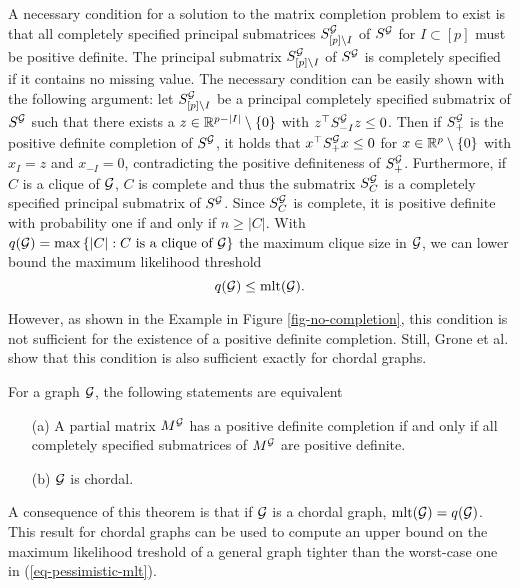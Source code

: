 A necessary condition for a solution to the matrix completion problem to exist is that all completely specified principal submatrices $S^{\mathcal{G}}_{[p]\setminus I}$ of $S^{\mathcal{G}}$ for $I \subset [p]$ must be positive definite. The principal submatrix $S^{\mathcal{G}}_{[p]\setminus I}$ of $S^{\mathcal{G}}$ is completely specified if it contains no missing value. The necessary condition can be easily shown with the following argument: let $S^{\mathcal{G}}_{[p]\setminus I}$ be a principal completely specified submatrix of $S^{\mathcal{G}}$ such that there exists a $z \in \mathbb{R}^{p-|I|}\setminus {\left\{0\right\}}$ with $z^\top S^{\mathcal{G}}_{-I} z \leq 0$. Then if $S^{\mathcal{G}}_+$ is the positive definite completion of $S^{\mathcal{G}}$, it holds that $x^\top S^{\mathcal{G}}_+ x \leq 0$ for $x \in \mathbb{R}^p \setminus {\left\{0\right\}}$ with $x_I = z$ and $x_{-I} = 0$, contradicting the positive definiteness of $S^{\mathcal{G}}_+$. Furthermore, if $C$ is a clique of ${\mathcal{G}}$, $C$ is complete and thus the submatrix $S^{\mathcal{G}}_C$ is a completely specified principal submatrix of $S^{\mathcal{G}}$. Since $S^{\mathcal{G}}_C$ is complete, it is positive definite with probability one if and only if $n \geq |C|$. With $q({\mathcal{G}}) = \max {\left\{|C| : C {\textrm{ is a clique of }} {\mathcal{G}}\right\}}$ the maximum clique size in ${\mathcal{G}}$, we can lower bound the maximum likelihood threshold
\begin{equation*}
    q({\mathcal{G}}) \leq {\textrm{mlt}}({\mathcal{G}}).
\end{equation*}



However, as shown in the Example in Figure \ref{fig-no-completion}, this condition is not sufficient for the existence of a positive definite completion. Still, Grone et al. \cite{GRONE1984109} show that this condition is also sufficient exactly for chordal graphs.
\begin{theorem} \label{thm-chordal-iff}
    For a graph ${\mathcal{G}}$, the following statements are equivalent
    \begin{itemize}
        \item[(a)] A partial matrix $M^{\mathcal{G}}$ has a positive definite completion if and only if all completely specified submatrices of $M^{\mathcal{G}}$ are positive definite.
        \item[(b)] ${\mathcal{G}}$ is chordal.
    \end{itemize}
\end{theorem}
A consequence of this theorem is that if ${\mathcal{G}}$ is a chordal graph, ${\textrm{mlt}}({\mathcal{G}}) = q({\mathcal{G}})$. This result for chordal graphs can be used to compute an upper bound on the maximum likelihood treshold of a general graph tighter than the worst-case one in (\ref{eq-pessimistic-mlt}). 

